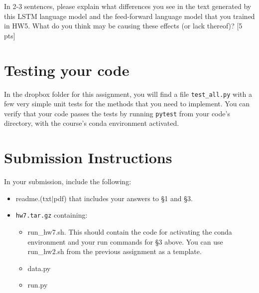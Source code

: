 \documentclass[11pt]{article}
\begin{document}
\vspace{2em}
 In 2-3 sentences, please explain what differences you see in the text generated by this LSTM language model and the feed-forward language model that you trained in HW5. What do you think may be causing these effects (or lack thereof)? \hfill [5 pts]


\section{Testing your code}

In the dropbox folder for this assignment, you will find a file \texttt{test\_all.py} with a few very simple unit tests for the methods that you need to implement.  You can verify that your code passes the tests by running \texttt{pytest} from your code's directory, with the course's conda environment activated.


\section*{Submission Instructions}

In your submission, include the following:
\begin{itemize}
  \item readme.(txt$\mid$pdf) that includes your answers to \S1 and \S3. 
  \item \texttt{hw7.tar.gz} containing:
  \begin{itemize}
    \item run\_hw7.sh.  This should contain the code for activating the conda environment and your run commands for \S3 above.  You can use run\_hw2.sh from the previous assignment as a template.
    \item data.py
    \item run.py
  \end{itemize}
\end{itemize}
\end{document}
